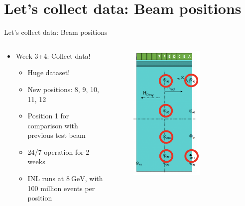 \documentclass[xcolor = table]{beamer}
\begin{document}
\section{Let's collect data: Beam positions}
\begin{frame}{Let's collect data: Beam positions}
  \begin{columns}
    \begin{column}{0.55\textwidth}
      \begin{itemize}
        \item{Week 3+4: Collect data!}
        \begin{itemize}
          \item{Huge dataset!}
          \item{New positions: 8, 9, 10, 11, 12}
          \item{Position 1 for comparison with previous test beam}
          \item{24/7 operation for 2 weeks}
          \item{INL runs at $\SI{8}{\giga\eV}$, with 100 million events per position}
        \end{itemize}
      \end{itemize}
    \end{column}
    \begin{column}{0.45\textwidth}
      \begin{figure}
        \centering
        \includegraphics[width = 0.65\textwidth]{Plots/BeamPositions.png}
      \end{figure}
    \end{column}
  \end{columns}
\end{frame}
\end{document}
